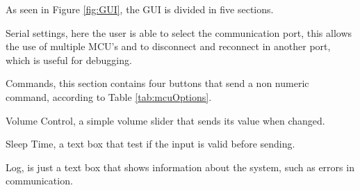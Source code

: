 As seen in Figure \ref{fig:GUI}, the GUI is divided in five sections.

Serial settings, here the user is able to select the communication port, this allows the use of multiple MCU's and to disconnect and reconnect in another port, which is useful for debugging.

Commands, this section contains four buttons that send a non numeric command, according to Table \ref{tab:mcuOptions}.

Volume Control, a simple volume slider that sends its value when changed.

Sleep Time, a text box that test if the input is valid before sending.

Log, is just a text box that shows information about the system, such as errors in communication.